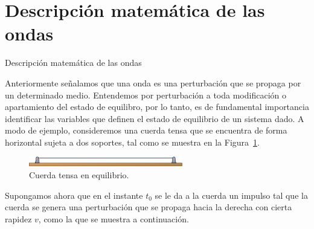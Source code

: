 \documentclass[11pt,handout,aspectratio=1610]{beamer}
\newcommand{\vs}{\vspace{11pt}}
\begin{document}
\section{Descripción matemática de las ondas}

\begin{frame}{Descripción matemática de las ondas}

    Anteriormente señalamos que una onda es una perturbación que se propaga por un determinado medio. Entendemos por perturbación a toda modificación o apartamiento del estado de equilibro, por lo tanto, es de fundamental importancia identificar las variables que definen el estado de equilibrio de un sistema dado. A modo de ejemplo, consideremos una cuerda tensa que se encuentra de forma horizontal sujeta a dos soportes, tal como se muestra en la Figura~\ref{fig:cuerda_equilibrio}.

    \vs 
    \begin{figure}
        \centering
        \includegraphics[width=0.6\textwidth]{../figs/cuerda_equilibrio.pdf}
        \caption{Cuerda tensa en equilibrio.}
        \label{fig:cuerda_equilibrio}
    \end{figure}

    Supongamos ahora que en el instante $t_0$ se le da a la cuerda un impulso tal que la cuerda se genera una perturbación que se propaga hacia la derecha con cierta rapidez $v$, como la que se muestra a continuación.

\end{frame}
\end{document}
